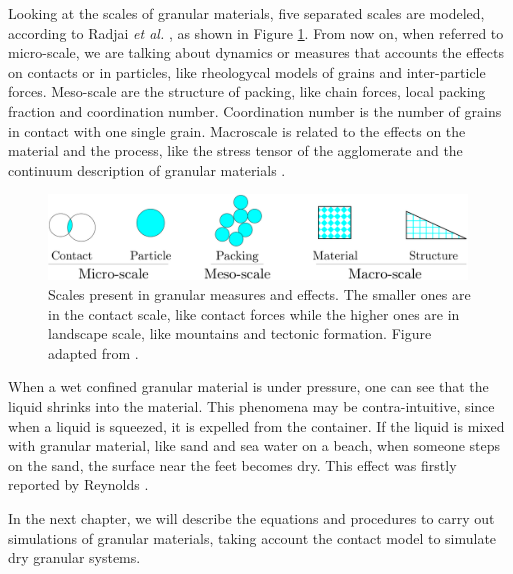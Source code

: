     Looking at the scales of granular materials, five separated scales are modeled, according to Radjai \textit{et al.} \cite{Modeling_Granular_Materials}, as shown in Figure \ref{fig:granular_scales}. From now on, when referred to micro-scale, we are talking about dynamics or measures that accounts the effects on contacts or in particles, like rheologycal models of grains and inter-particle forces. Meso-scale are the structure of packing, like chain forces, local packing fraction and coordination number. Coordination number is the number of grains in contact with one single grain. Macroscale is related to the effects on the material and the process, like the stress tensor of the agglomerate and the continuum description of granular materials \cite{Modeling_Granular_Materials}.

\begin{figure}
    \centering
    \includegraphics[width=0.99\textwidth]{04-figuras/Granular_Scales.png}
    \caption[Granular scales.]{Scales present in granular measures and effects. The smaller ones are in the contact scale, like contact forces while the higher ones are in landscape scale, like mountains and tectonic formation. Figure adapted from \cite{Modeling_Granular_Materials}.}
    \label{fig:granular_scales}
\end{figure}

    When a wet confined granular material is under pressure, one can see that the liquid shrinks into the material. This phenomena may be contra-intuitive, since when a liquid is squeezed, it is expelled from the container. If the liquid is mixed with granular material, like sand and sea water on a beach, when someone steps on the sand, the surface near the feet becomes dry. This effect was firstly reported by Reynolds \cite{On_the_dilatancy}.

    In the next chapter, we will describe the equations and procedures to carry out simulations of granular materials, taking account the contact model to simulate dry granular systems.
